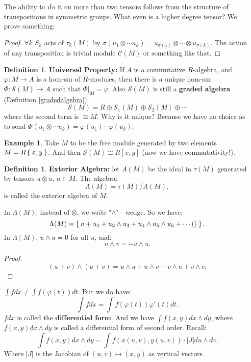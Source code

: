 \documentclass[12pt]{amsbook}
\theoremstyle{plain}
\numberwithin{section}{chapter}
\numberwithin{equation}{chapter}
\theoremstyle{definition}
\newtheorem{Def}[theorem]{Definition}
\newtheorem{Ex}[theorem]{Example}
\theoremstyle{remark}
\newcommand{\tens}{\otimes}
\renewcommand{\phi}{\varphi}
\begin{document}
The ability to do it on more than two tensors follows from the structure of transpositions in symmetric groups. What even is a higher degree tensor? We prove something:
\begin{proof} 
$\forall k$ $S_k$ acts of $\tau_k(M)$ by $\sigma(u_1 \tens \cdots u_k) = u_{\sigma(1)} \tens \cdots \tens u_{\sigma(k)}$. The action of any transposition is trivial module $\mathcal{C}(M)$ or something like that. 
\end{proof}

\begin{Def}
\textbf{Universal Property: }If $A$ is a commutative $R$-algebra, and $\phi:M \to A$ is a hom-sm of $R$-modules, then there is a unique hom-sm $\Phi:\mathcal{S}(M) \to A$ such that $\Phi|_{M} = \phi$. Also $\mathcal{S}(M)$ is still a \textbf{graded algebra} (Definition \ref{gradedalgebra}):
$$
\mathcal{S}(M) = R \oplus \mathcal{S}_1(M) \oplus \mathcal{S}_2(M) \oplus \cdots
$$
where the second term is $\cong M$. Why is it unique? Because we have no choice as to send $\Phi(u_1 \tens \cdots u_k) = \phi(u_1) \cdots \phi(u_k)$. 
\end{Def}

\begin{Ex}
Take $M$ to be the free module generated by two elements $M = R\Set{x,y}$. And then $\mathcal{S}(M) \cong R[x,y]$ (now we have commutativity!).
\end{Ex}

\begin{Def}
\textbf{Exterior Algebra: }let $A(M)$ be the ideal in $\tau(M)$ generated by tensors $u \tens u$, $u \in M$. The algebra:
$$
\Lambda(M) = \tau(M)/A(M),
$$
is called the exterior algebra of $M$. 
\end{Def}

In $\Lambda(M)$, instead of $\tens$, we write "$\wedge$" - wedge. So we have:
$$
\Lambda(M) = \Set{a + u_1 + u_2 \wedge u_3 + u_4 \wedge u_5 \wedge u_6 + \cdots ()}.
$$
In $\Lambda(M)$, $u \wedge u = 0$ for all $u$, and:
$$
u \wedge v = -v \wedge u.
$$
\begin{proof} 
$$
(u + v) \wedge (u + v) = u \wedge u + u \wedge v + v \wedge u + v \wedge v.
$$
\end{proof}

$ \int fdx \neq \int f(\phi(t))dt$. But we do have:
$$
\int fdx = \int f(\phi(t))\phi'(t) dt.
$$
$fdx$ is called the \textbf{differential form}. And we have $\int f(x,y)dx \wedge dy$, where $f(x,y)dx \wedge dy$ is called a differential form of second order. Recall: 
$$
\int f(x,y)dx \wedge dy = \int f(x(u,v),y(u,v))\cdot |J|du\wedge dv.
$$
Where $|J|$ is the Jacobian of $(u,v) \mapsto (x,y)$ as vertical vectors. 
\end{document}
